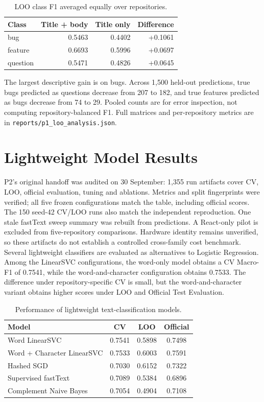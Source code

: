 \begin{table}[H]
\centering
\caption{LOO class F1 averaged equally over repositories.}
\begin{tabular}{lrrr}
\toprule
Class & Title + body & Title only & Difference \\
\midrule
bug & 0.5463 & 0.4402 & +0.1061 \\
feature & 0.6693 & 0.5996 & +0.0697 \\
question & 0.5471 & 0.4826 & +0.0645 \\
\bottomrule
\end{tabular}
\end{table}
The largest descriptive gain is on bugs. Across 1,500 held-out predictions, true bugs predicted as questions decrease from 207 to 182, and true features predicted as bugs decrease from 74 to 29. Pooled counts are for error inspection, not computing repository-balanced F1. Full matrices and per-repository metrics are in \texttt{reports/p1\_loo\_analysis.json}.

\section{Lightweight Model Results}
P2's original handoff was audited on 30 September: 1,355 run artifacts cover CV, LOO, official evaluation, tuning and ablations. Metrics and split fingerprints were verified; all five frozen configurations match the table, including official scores. The 150 seed-42 CV/LOO runs also match the independent reproduction. One stale fastText sweep summary was rebuilt from predictions. A React-only pilot is excluded from five-repository comparisons. Hardware identity remains unverified, so these artifacts do not establish a controlled cross-family cost benchmark.
Several lightweight classifiers are evaluated as alternatives to Logistic Regression. Among the LinearSVC configurations, the word-only model obtains a CV Macro-F1 of 0.7541, while the word-and-character configuration obtains 0.7533. The difference under repository-specific CV is small, but the word-and-character variant obtains higher scores under LOO and Official Test Evaluation.

\begin{table}[H]
\centering
\caption{Performance of lightweight text-classification models.}
\label{tab:lightweight-results}
\begin{tabular}{lccc}
\toprule
\textbf{Model} & \textbf{CV} & \textbf{LOO} & \textbf{Official} \\
\midrule
Word LinearSVC & 0.7541 & 0.5898 & 0.7498 \\
Word + Character LinearSVC & 0.7533 & 0.6003 & 0.7591 \\
Hashed SGD & 0.7030 & 0.6152 & 0.7322 \\
Supervised fastText & 0.7089 & 0.5384 & 0.6896 \\
Complement Naive Bayes & 0.7054 & 0.4904 & 0.7108 \\
\bottomrule
\end{tabular}
\end{table}

